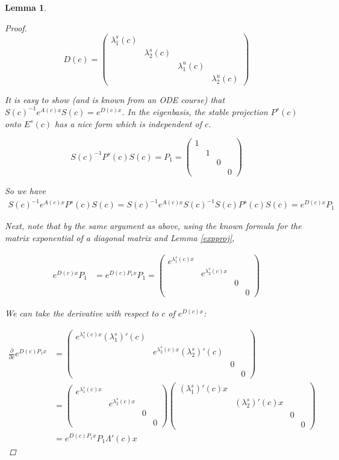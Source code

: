 \documentclass[12pt]{article}
\newtheorem{lemma}{Lemma}
\begin{document}
\begin{lemma}
\begin{proof}
\[
D(c) = \begin{pmatrix}
\lambda^s_1(c) &&& \\ & \lambda^s_2(c)&& \\ && \lambda^u_1(c) & \\ &&& \lambda^u_2(c) 
\end{pmatrix}
\]

It is easy to show (and is known from an ODE course) that $S(c)^{-1} e^{A(c)x} S(c) = e^{D(c) x}$. In the eigenbasis, the stable projection $P^s(c)$ onto $E^s(c)$ has a nice form which is independent of $c$.

\[
S(c)^{-1} P^s(c) S(c) = P_1 = \begin{pmatrix}
1 &&& \\ & 1 && \\ && 0 & \\ &&& 0 
\end{pmatrix}
\]

So we have
\begin{align*}
S(c)^{-1} e^{A(c) x} P^s(c) S(c) = S(c)^{-1} e^{A(c) x} S(c)^{-1} S(c) P^s(c) S(c) = e^{D(c) x} P_1
\end{align*}

Next, note that by the same argument as above, using the known formula for the matrix exponential of a diagonal matrix and Lemma \ref{expproj},

\begin{align*}
e^{D(c) x} P_1 &= e^{ D(c)P_1 x} P_1 = 
\begin{pmatrix}
e^{\lambda^s_1(c) x} &&& \\ & e^{\lambda^s_2(c) x} && \\ && 0 & \\ &&& 0 
\end{pmatrix}
\end{align*}

We can take the derivative with respect to $c$ of $e^{D(c) x}$:

\begin{align*}
\frac{\partial}{\partial c} e^{D(c) P_1 x} &=
\begin{pmatrix}
e^{\lambda^s_1(c) x} (\lambda^s_1)'(c) &&& \\ & e^{\lambda^s_2(c) x} (\lambda^s_2)'(c) && \\ && 0 & \\ &&& 0 
\end{pmatrix} \\
&= \begin{pmatrix}
e^{\lambda^s_1(c) x} &&& \\ & e^{\lambda^s_2(c) x}  && \\ && 0 & \\ &&& 0 
\end{pmatrix}
\begin{pmatrix} (\lambda^s_1)'(c) x &&& \\ & (\lambda^s_2)'(c) x && \\ && 0 & \\ &&& 0 \end{pmatrix}  \\
&= e^{D(c) P_1 x} P_1 \Lambda'(c) x
\end{align*}


\end{proof}
\end{lemma}
\end{document}
